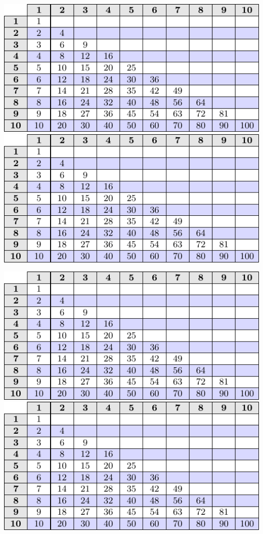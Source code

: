 \begin{center}
	\includegraphics{gangetabell} \qquad
	\includegraphics{gangetabell}  
\end{center}
\vspace{10pt}
\begin{center}
	\includegraphics{gangetabell} \qquad
	\includegraphics{gangetabell}  
\end{center}
